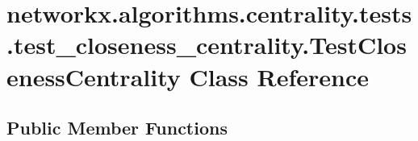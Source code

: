 \hypertarget{classnetworkx_1_1algorithms_1_1centrality_1_1tests_1_1test__closeness__centrality_1_1TestClosenessCentrality}{}\section{networkx.\+algorithms.\+centrality.\+tests.\+test\+\_\+closeness\+\_\+centrality.\+Test\+Closeness\+Centrality Class Reference}
\label{classnetworkx_1_1algorithms_1_1centrality_1_1tests_1_1test__closeness__centrality_1_1TestClosenessCentrality}
\subsection*{Public Member Functions}
